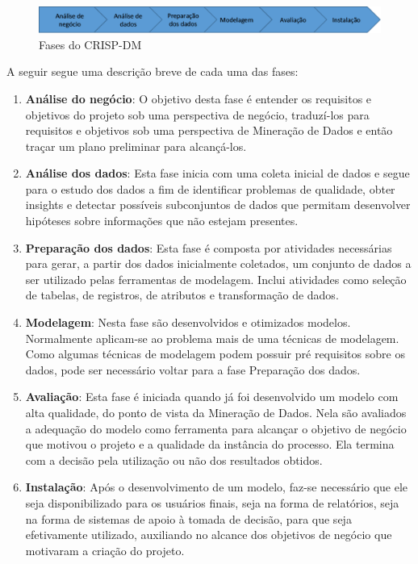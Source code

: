 \begin{figure}[H]
	\includegraphics[scale=0.8]{img/CRISP-DM-main.png}
	\caption{Fases do CRISP-DM}
	\label{img:CRISP-DM-diagram}
\end{figure}

A seguir segue uma descrição breve de cada uma das fases:

\begin{enumerate}

\item \textbf{Análise do negócio}:
O objetivo desta fase é entender os requisitos e objetivos do projeto sob uma perspectiva de negócio, traduzí-los para requisitos e objetivos sob uma perspectiva de Mineração de Dados e então traçar um plano preliminar para alcançá-los.

\item \textbf{Análise dos dados}:
Esta fase inicia com uma coleta inicial de dados e segue para o estudo dos dados a fim de identificar problemas de qualidade, obter insights e detectar possíveis subconjuntos de dados que permitam desenvolver hipóteses sobre informações que não estejam presentes.

\item \textbf{Preparação dos dados}:
Esta fase é composta por atividades necessárias para gerar, a partir dos dados inicialmente coletados, um conjunto de dados a ser utilizado pelas ferramentas de modelagem. Inclui atividades como seleção de tabelas, de registros, de atributos e transformação de dados.

\item \textbf{Modelagem}:
Nesta fase são desenvolvidos e otimizados modelos. Normalmente aplicam-se ao problema mais de uma técnicas de modelagem. Como algumas técnicas de modelagem podem possuir pré requisitos sobre os dados, pode ser necessário voltar para a fase Preparação dos dados.

\item \textbf{Avaliação}:
Esta fase é iniciada quando já foi desenvolvido um modelo com alta qualidade, do ponto de vista da Mineração de Dados. Nela são avaliados a adequação do modelo como ferramenta para alcançar o objetivo de negócio que motivou o projeto e a qualidade da instância do processo. Ela termina com a decisão pela utilização ou não dos resultados obtidos.

\item \textbf{Instalação}:
Após o desenvolvimento de um modelo, faz-se necessário que ele seja disponibilizado para os usuários finais, seja na forma de relatórios, seja na forma de sistemas de apoio à tomada de decisão, para que seja efetivamente utilizado, auxiliando no alcance dos objetivos de negócio que motivaram a criação do projeto.

\end{enumerate}

